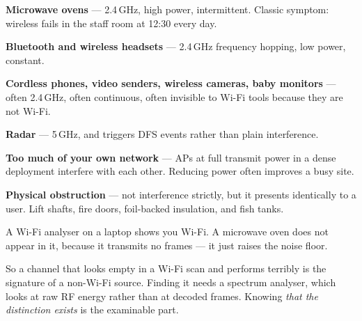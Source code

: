 \begin{tight}
  \item \textbf{Microwave ovens} --- 2.4\,GHz, high power, intermittent. Classic
        symptom: wireless fails in the staff room at 12:30 every day.
  \item \textbf{Bluetooth and wireless headsets} --- 2.4\,GHz frequency hopping,
        low power, constant.
  \item \textbf{Cordless phones, video senders, wireless cameras, baby
        monitors} --- often 2.4\,GHz, often continuous, often invisible to
        Wi-Fi tools because they are not Wi-Fi.
  \item \textbf{Radar} --- 5\,GHz, and triggers DFS events rather than plain
        interference.
  \item \textbf{Too much of your own network} --- APs at full transmit power in a
        dense deployment interfere with each other. Reducing power often improves
        a busy site.
  \item \textbf{Physical obstruction} --- not interference strictly, but it
        presents identically to a user. Lift shafts, fire doors, foil-backed
        insulation, and fish tanks.
\end{tight}

\begin{conceptbox}
A Wi-Fi analyser on a laptop shows you Wi-Fi. A microwave oven does not appear in
it, because it transmits no frames --- it just raises the noise floor.

So a channel that looks empty in a Wi-Fi scan and performs terribly is the
signature of a non-Wi-Fi source. Finding it needs a spectrum analyser, which
looks at raw RF energy rather than at decoded frames. Knowing \emph{that the
distinction exists} is the examinable part.
\end{conceptbox}

